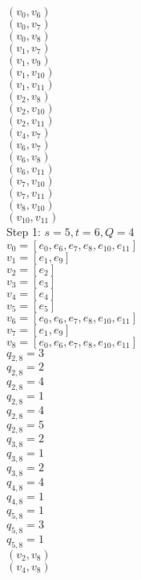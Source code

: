 $(v_{0},v_{6})$\\
$(v_{0},v_{7})$\\
$(v_{0},v_{8})$\\
$(v_{1},v_{7})$\\
$(v_{1},v_{9})$\\
$(v_{1},v_{10})$\\
$(v_{1},v_{11})$\\
$(v_{2},v_{8})$\\
$(v_{2},v_{10})$\\
$(v_{2},v_{11})$\\
$(v_{4},v_{7})$\\
$(v_{6},v_{7})$\\
$(v_{6},v_{8})$\\
$(v_{6},v_{11})$\\
$(v_{7},v_{10})$\\
$(v_{7},v_{11})$\\
$(v_{8},v_{10})$\\
$(v_{10},v_{11})$\\


Step 1:
$s=5,t=6,Q=4$\\
$v_{0}=[e_{0},e_{6},e_{7},e_{8},e_{10},e_{11}]$\\
$v_{1}=[e_{1},e_{9}]$\\
$v_{2}=[e_{2}]$\\
$v_{3}=[e_{3}]$\\
$v_{4}=[e_{4}]$\\
$v_{5}=[e_{5}]$\\
$v_{6}=[e_{0},e_{6},e_{7},e_{8},e_{10},e_{11}]$\\
$v_{7}=[e_{1},e_{9}]$\\
$v_{8}=[e_{0},e_{6},e_{7},e_{8},e_{10},e_{11}]$\\
$q_{2,8}=3$\\
$q_{2,8}=2$\\
$q_{2,8}=4$\\
$q_{2,8}=1$\\
$q_{2,8}=4$\\
$q_{2,8}=5$\\
$q_{3,8}=2$\\
$q_{3,8}=1$\\
$q_{3,8}=2$\\
$q_{4,8}=4$\\
$q_{4,8}=1$\\
$q_{5,8}=1$\\
$q_{5,8}=3$\\
$q_{5,8}=1$\\
$(v_{2},v_{8})$\\
$(v_{4},v_{8})$\\


